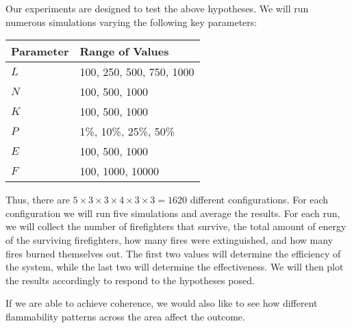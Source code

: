\documentclass{article}
\begin{document}
Our experiments are designed to test the above hypotheses.  We will run numerous
simulations varying the following key parameters:

\bigskip
\begin{tabular}{ | l | l | }
  \hline
  {\bf Parameter} & {\bf Range of Values} \\
  \hline
  $L$ & 100, 250, 500, 750, 1000\\
  \hline
  $N$ & 100, 500, 1000 \\
  \hline
  $K$ & 100, 500, 1000 \\
  \hline
  $P$ & 1\%, 10\%, 25\%, 50\% \\
  \hline
  $E$ & 100, 500, 1000 \\
  \hline
  $F$ & 100, 1000, 10000 \\
  \hline
\end{tabular}
\bigskip

Thus, there are $5 \times 3 \times 3 \times 4 \times 3 \times 3 = 1620$ different
configurations.  For each configuration we will run five simulations and
average the results.  For each run, we will collect the number of firefighters
that survive, the total amount of energy of the surviving firefighters, 
how many fires were extinguished, and how many fires burned themselves out.
The first two values will determine the efficiency of the system, while
the last two will determine the effectiveness.  We will then plot the results
accordingly to respond to the hypotheses posed.

If we are able to achieve coherence, we would also like to see how different
flammability patterns across the area affect the outcome.
\end{document}
